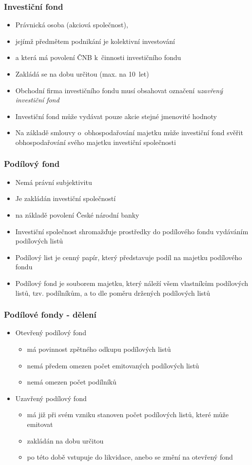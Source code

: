 \documentclass{beamer}
\begin{document}
\begin{frame}
\frametitle{Investiční fond}
\begin{itemize} 
\item Právnická osoba (akciová společnost), 
\item jejímž předmětem podnikání je kolektivní investování 
\item a která má povolení ČNB k~činnosti investičního fondu
\item Zakládá se na dobu určitou (max. na 10~let)
\item Obchodní firma investičního fondu musí obsahovat označení \emph{uzavřený investiční fond}
\item Investiční fond může vydávat pouze akcie stejné jmenovité hodnoty
\item Na základě smlouvy o~obhospodařování majetku může investiční fond svěřit obhospodařování svého majetku investiční společnosti
\end{itemize} 
\end{frame}


\begin{frame}
\frametitle{Podílový fond}
\begin{itemize} 
\item Nemá právní subjektivitu
\item Je zakládán investiční společností
\item na základě povolení České národní banky
\item Investiční společnost shromažďuje prostředky do podílového fondu vydáváním podílových listů
\item Podílový list je cenný papír, který představuje podíl na majetku podílového fondu
\item Podílový fond je souborem majetku, který náleží všem vlastníkům podílových listů, tzv. podílníkům, a to dle poměru držených podílových listů  
\end{itemize} 
\end{frame}


\begin{frame}
\frametitle{Podílové fondy - dělení}
\begin{itemize}
  \item Otevřený podílový fond
    \begin{itemize}
      \item má povinnost zpětného odkupu podílových listů
      \item nemá předem omezen počet emitovaných podílových listů
      \item nemá omezen počet podílníků
     \end{itemize}
  \item Uzavřený podílový fond
    \begin{itemize}
     \item má již při svém vzniku stanoven počet podílových listů, které může emitovat
     \item zakládán na dobu určitou
     \item po této době vstupuje do likvidace, anebo se změní na otevřený fond
    \end{itemize}
\end{itemize}  
\end{frame}
\end{document}

